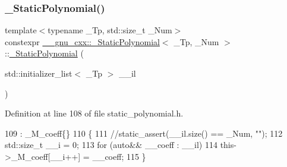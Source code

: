 \subsubsection{\texorpdfstring{\+\_\+\+Static\+Polynomial()}{\_StaticPolynomial()}\hspace{0.1cm}{\footnotesize\ttfamily [5/7]}}
{\footnotesize\ttfamily template$<$typename \+\_\+\+Tp, std\+::size\+\_\+t \+\_\+\+Num$>$ \\
constexpr \hyperlink{class____gnu__cxx_1_1__StaticPolynomial}{\+\_\+\+\_\+gnu\+\_\+cxx\+::\+\_\+\+Static\+Polynomial}$<$ \+\_\+\+Tp, \+\_\+\+Num $>$\+::\hyperlink{class____gnu__cxx_1_1__StaticPolynomial}{\+\_\+\+Static\+Polynomial} (\begin{DoxyParamCaption}\item[{std\+::initializer\+\_\+list$<$ \+\_\+\+Tp $>$}]{\+\_\+\+\_\+il }\end{DoxyParamCaption})\hspace{0.3cm}{\ttfamily [inline]}}



Definition at line 108 of file static\+\_\+polynomial.\+h.


\begin{DoxyCode}
109       : \_M\_coeff\{\}
110       \{
111         \textcolor{comment}{//static\_assert(\_\_il.size() == \_Num, "");}
112         std::size\_t \_\_i = 0;
113         \textcolor{keywordflow}{for} (\textcolor{keyword}{auto}&& \_\_coeff : \_\_il)
114           this->\_M\_coeff[\_\_i++] = \_\_coeff;
115       \}
\end{DoxyCode}
\mbox{\label{class____gnu__cxx_1_1__StaticPolynomial_a3932d8d84fb3dbcb800bdf12a001b1c6}} 
